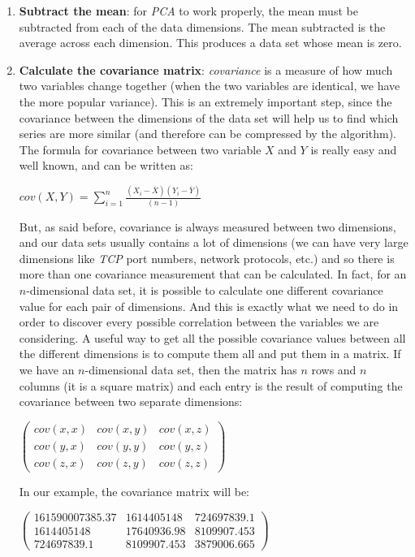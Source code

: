 \documentclass[12pt,a4paper,cucitura]{toptesi}
\begin{document}
\begin{enumerate}
\item \textbf{Subtract the mean}: for \emph{PCA} to work properly, the mean must be subtracted from each of the data dimensions. The mean subtracted is the average across each dimension. This produces a data set whose mean is zero.
\item \textbf{Calculate the covariance matrix}: \emph{covariance} is a measure of how much two variables change together (when the two variables are identical, we have the more popular variance).
This is an extremely important step, since the covariance between the dimensions of the data set will help us to find which series are more similar (and therefore can be compressed by the algorithm).
The formula for covariance between two variable $X$ and $Y$ is really easy and well known, and can be written as:

\begin{center}
\Large
$cov(X,Y) = \sum_{i=1}^{n}{\frac{(X_i - \overline{X})(Y_i - \overline{Y})}{(n-1)}}$
\end{center}

But, as said before, covariance is always measured between two dimensions, and our data sets usually contains a lot of dimensions (we can have very large dimensions like \emph{TCP} port numbers, network protocols, etc.) and so there is more than one covariance measurement that can be calculated. 
In fact, for an $n$-dimensional data set, it is possible to calculate one different covariance value for each pair of dimensions. And this is exactly what we need to do in order to discover every possible correlation between the variables we are considering.
A useful way to get all the possible covariance values between all the different dimensions is to compute them all and put them in a matrix. If we have an $n$-dimensional data set, then the matrix has $n$ rows and $n$ columns (it is a square matrix) and each entry is the result of computing the covariance between two separate dimensions:

\begin{center}
\Large
$\begin{pmatrix}
cov(x,x) & cov(x,y) & cov(x,z) \\ 
cov(y,x) & cov(y,y) & cov(y,z) \\ 
cov(z,x) & cov(z,y) & cov(z,z)
\end{pmatrix} $
\end{center}

In our example, the covariance matrix will be: 

\begin{center}
$\begin{pmatrix}
161590007385.37 & 1614405148 & 724697839.1 \\ 
1614405148 & 17640936.98 & 8109907.453 \\ 
724697839.1 & 8109907.453 & 3879006.665
\end{pmatrix} $
\end{center}


\end{enumerate}
\end{document}

